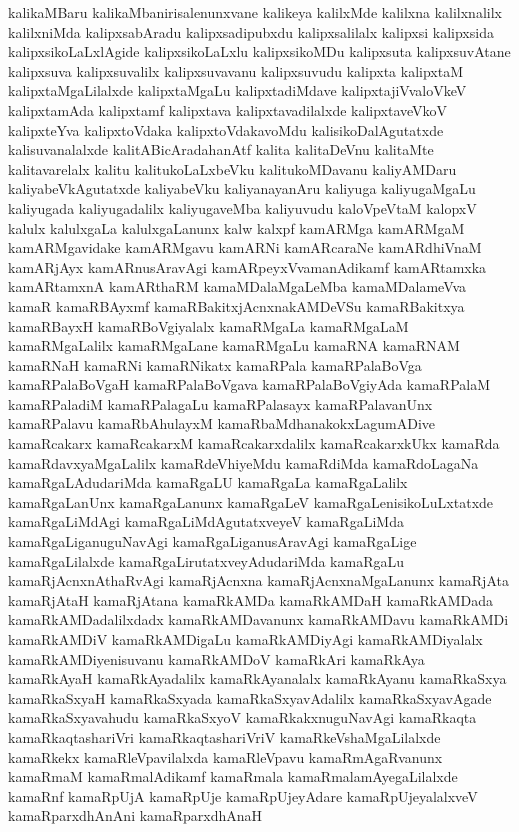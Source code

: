 {kalikaMBaru
kalikaMbanirisalenunxvane
kalikeya
kalilxMde
kalilxna
kalilxnalilx
kalilxniMda
kalipxsabAradu
kalipxsadipubxdu
kalipxsalilalx
kalipxsi
kalipxsida
kalipxsikoLaLxlAgide
kalipxsikoLaLxlu
kalipxsikoMDu
kalipxsuta
kalipxsuvAtane
kalipxsuva
kalipxsuvalilx
kalipxsuvavanu
kalipxsuvudu
kalipxta
kalipxtaM
kalipxtaMgaLilalxde
kalipxtaMgaLu
kalipxtadiMdave
kalipxtajiVvaloVkeV
kalipxtamAda
kalipxtamf
kalipxtava
kalipxtavadilalxde
kalipxtaveVkoV
kalipxteYva
kalipxtoVdaka
kalipxtoVdakavoMdu
kalisikoDalAgutatxde
kalisuvanalalxde
kalitABicAradahanAtf
kalita
kalitaDeVnu
kalitaMte
kalitavarelalx
kalitu
kalitukoLaLxbeVku
kalitukoMDavanu
kaliyAMDaru
kaliyabeVkAgutatxde
kaliyabeVku
kaliyanayanAru
kaliyuga
kaliyugaMgaLu
kaliyugada
kaliyugadalilx
kaliyugaveMba
kaliyuvudu
kaloVpeVtaM
kalopxV
kalulx
kalulxgaLa
kalulxgaLanunx
kalw
kalxpf
kamARMga
kamARMgaM
kamARMgavidake
kamARMgavu
kamARNi
kamARcaraNe
kamARdhiVnaM
kamARjAyx
kamARnusAravAgi
kamARpeyxVvamanAdikamf
kamARtamxka
kamARtamxnA
kamARthaRM
kamaMDalaMgaLeMba
kamaMDalameVva
kamaR
kamaRBAyxmf
kamaRBakitxjAcnxnakAMDeVSu
kamaRBakitxya
kamaRBayxH
kamaRBoVgiyalalx
kamaRMgaLa
kamaRMgaLaM
kamaRMgaLalilx
kamaRMgaLane
kamaRMgaLu
kamaRNA
kamaRNAM
kamaRNaH
kamaRNi
kamaRNikatx
kamaRPala
kamaRPalaBoVga
kamaRPalaBoVgaH
kamaRPalaBoVgava
kamaRPalaBoVgiyAda
kamaRPalaM
kamaRPaladiM
kamaRPalagaLu
kamaRPalasayx
kamaRPalavanUnx
kamaRPalavu
kamaRbAhulayxM
kamaRbaMdhanakokxLagumADive
kamaRcakarx
kamaRcakarxM
kamaRcakarxdalilx
kamaRcakarxkUkx
kamaRda
kamaRdavxyaMgaLalilx
kamaRdeVhiyeMdu
kamaRdiMda
kamaRdoLagaNa
kamaRgaLAdudariMda
kamaRgaLU
kamaRgaLa
kamaRgaLalilx
kamaRgaLanUnx
kamaRgaLanunx
kamaRgaLeV
kamaRgaLenisikoLuLxtatxde
kamaRgaLiMdAgi
kamaRgaLiMdAgutatxveyeV
kamaRgaLiMda
kamaRgaLiganuguNavAgi
kamaRgaLiganusAravAgi
kamaRgaLige
kamaRgaLilalxde
kamaRgaLirutatxveyAdudariMda
kamaRgaLu
kamaRjAcnxnAthaRvAgi
kamaRjAcnxna
kamaRjAcnxnaMgaLanunx
kamaRjAta
kamaRjAtaH
kamaRjAtana
kamaRkAMDa
kamaRkAMDaH
kamaRkAMDada
kamaRkAMDadalilxdadx
kamaRkAMDavanunx
kamaRkAMDavu
kamaRkAMDi
kamaRkAMDiV
kamaRkAMDigaLu
kamaRkAMDiyAgi
kamaRkAMDiyalalx
kamaRkAMDiyenisuvanu
kamaRkAMDoV
kamaRkAri
kamaRkAya
kamaRkAyaH
kamaRkAyadalilx
kamaRkAyanalalx
kamaRkAyanu
kamaRkaSxya
kamaRkaSxyaH
kamaRkaSxyada
kamaRkaSxyavAdalilx
kamaRkaSxyavAgade
kamaRkaSxyavahudu
kamaRkaSxyoV
kamaRkakxnuguNavAgi
kamaRkaqta
kamaRkaqtashariVri
kamaRkaqtashariVriV
kamaRkeVshaMgaLilalxde
kamaRkekx
kamaRleVpavilalxda
kamaRleVpavu
kamaRmAgaRvanunx
kamaRmaM
kamaRmalAdikamf
kamaRmala
kamaRmalamAyegaLilalxde
kamaRnf
kamaRpUjA
kamaRpUje
kamaRpUjeyAdare
kamaRpUjeyalalxveV
kamaRparxdhAnAni
kamaRparxdhAnaH
}
